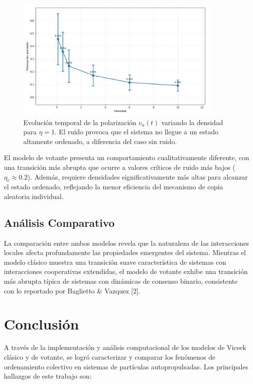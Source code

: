 \documentclass{article}
\begin{document}
\begin{figure}[H]
\centering
\includegraphics[width=0.9\textwidth]{Voter Ruido 1 variando densidad avg.png}
\caption{Evolución temporal de la polarización $v_a(t)$ variando la densidad para $\eta = 1$. El ruido provoca que el sistema no llegue a un estado altamente ordenado, a diferencia del caso sin ruido.}
\label{fig:va_tiempo_densidad_voter1}
\end{figure}


El modelo de votante presenta un comportamiento cualitativamente diferente, con una transición más abrupta que ocurre a valores críticos de ruido más bajos ($\eta_c \approx 0.2$). Además, requiere densidades significativamente más altas para alcanzar el estado ordenado, reflejando la menor eficiencia del mecanismo de copia aleatoria individual.

\subsection{Análisis Comparativo}

La comparación entre ambos modelos revela que la naturaleza de las interacciones locales afecta profundamente las propiedades emergentes del sistema. Mientras el modelo clásico muestra una transición suave característica de sistemas con interacciones cooperativas extendidas, el modelo de votante exhibe una transición más abrupta típica de sistemas con dinámicas de consenso binario, consistente con lo reportado por Baglietto \& Vazquez [2].

\section{Conclusión}
A través de la implementación y análisis computacional de los modelos de Vicsek clásico y de votante, se logró caracterizar y comparar los fenómenos de ordenamiento colectivo en sistemas de partículas autopropulsadas. Los principales hallazgos de este trabajo son:
\end{document}
